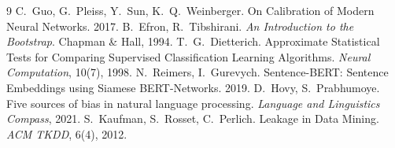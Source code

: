 \documentclass[11pt,a4paper]{article}
\begin{document}
\begin{thebibliography}{9}
 C.\ Guo, G.\ Pleiss, Y.\ Sun, K.\ Q.\ Weinberger.
  On Calibration of Modern Neural Networks. 2017.
 B.\ Efron, R.\ Tibshirani.
  \emph{An Introduction to the Bootstrap}. Chapman \& Hall, 1994.
 T.\ G.\ Dietterich.
  Approximate Statistical Tests for Comparing Supervised Classification
  Learning Algorithms. \emph{Neural Computation}, 10(7), 1998.
 N.\ Reimers, I.\ Gurevych.
  Sentence-BERT: Sentence Embeddings using Siamese BERT-Networks. 2019.
 D.\ Hovy, S.\ Prabhumoye.
  Five sources of bias in natural language processing.
  \emph{Language and Linguistics Compass}, 2021.
 S.\ Kaufman, S.\ Rosset, C.\ Perlich.
  Leakage in Data Mining. \emph{ACM TKDD}, 6(4), 2012.
\end{thebibliography}
\end{document}

